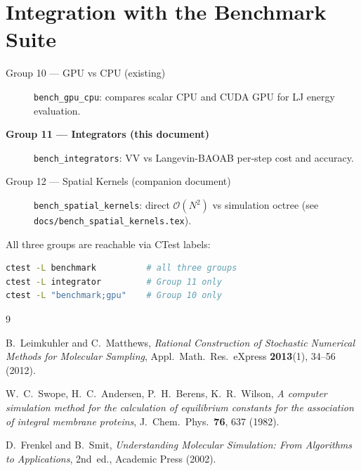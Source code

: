 \documentclass[11pt,a4paper]{article}
\theoremstyle{definition}
\theoremstyle{plain}
\begin{document}
\section{Integration with the Benchmark Suite}
\label{sec:suite}

\begin{description}
  \item[Group 10 — GPU vs CPU (existing)] \texttt{bench\_gpu\_cpu}:
	compares scalar CPU and CUDA GPU for LJ energy evaluation.
  \item[\textbf{Group 11 — Integrators (this document)}]
	\texttt{bench\_integrators}: VV vs Langevin-BAOAB per-step cost and
	accuracy.
  \item[Group 12 — Spatial Kernels (companion document)]
	\texttt{bench\_spatial\_kernels}: direct $\mathcal{O}(N^2)$ vs
	simulation octree (see \texttt{docs/bench\_spatial\_kernels.tex}).
\end{description}

All three groups are reachable via CTest labels:
\begin{lstlisting}[language=bash,basicstyle=\ttfamily\small]
ctest -L benchmark          # all three groups
ctest -L integrator         # Group 11 only
ctest -L "benchmark;gpu"    # Group 10 only
\end{lstlisting}

\begin{thebibliography}{9}

B.~Leimkuhler and C.~Matthews,
\emph{Rational Construction of Stochastic Numerical Methods for Molecular
Sampling},
Appl.\ Math.\ Res.\ eXpress \textbf{2013}(1), 34--56 (2012).

W.~C.~Swope, H.~C.~Andersen, P.~H.~Berens, K.~R.~Wilson,
\emph{A computer simulation method for the calculation of equilibrium
constants for the association of integral membrane proteins},
J.\ Chem.\ Phys.\ \textbf{76}, 637 (1982).

D.~Frenkel and B.~Smit,
\emph{Understanding Molecular Simulation: From Algorithms to Applications},
2nd~ed., Academic Press (2002).

\end{thebibliography}
\end{document}
